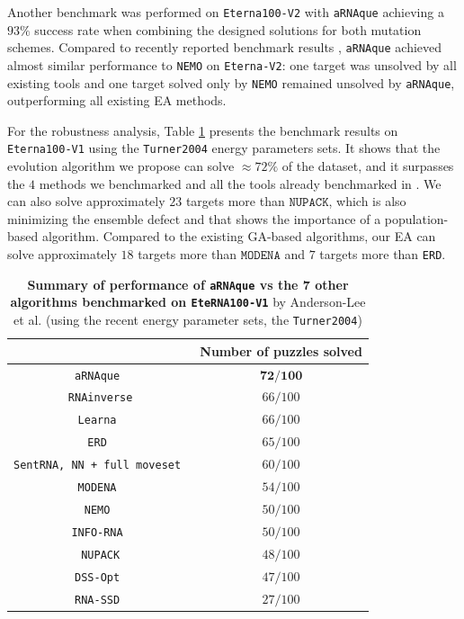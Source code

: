 Another benchmark was performed on \texttt{Eterna100-V2} with \texttt{aRNAque} achieving a $93\%$ success rate when combining the designed solutions for both mutation schemes. Compared to recently reported benchmark results \cite{Eterna}, \texttt{aRNAque} achieved almost similar performance to \texttt{NEMO} on \texttt{Eterna-V2}: one target was unsolved by all existing tools and one target solved only by \texttt{NEMO} remained unsolved by \texttt{aRNAque}, outperforming all existing EA methods. 


For the robustness analysis, Table {\ref{Tab:eterna}} presents the benchmark results on \texttt{Eterna100-V1} using the \texttt{Turner2004} energy parameters sets. It shows that the evolution algorithm we propose can solve \(\)\(\approx72\%\) of the dataset, and it surpasses the \(4\) methods we benchmarked and all the tools already benchmarked in \cite{shi2018sentrna}. We can also solve approximately \(23\) targets more than \(\texttt{NUPACK}\), which is also minimizing the ensemble defect and that shows the importance of a population-based algorithm. Compared to the existing GA-based algorithms, our EA can solve approximately \(18\) targets more than \(\texttt{MODENA}\) and $7$ targets more than \texttt{ERD}.


\begin{center}
	\begin{table}[t!]
		\caption{\textbf{Summary of performance of \texttt{aRNAque} vs the 7 other algorithms benchmarked on \texttt{EteRNA100-V1}} by Anderson-Lee et al. \cite{anderson2016principles} (using the recent energy parameter sets, the \texttt{Turner2004})} 
		\label{Tab:eterna}
		\centering
		\begin{tabular}[H]{|c|c|}
			\hline
			\text{Methods}& Number of puzzles solved\\
			\hline
			\texttt{aRNAque }&$\textbf{72/100}$\\
			\hline
			\texttt{RNAinverse}&$66/100$\\
			\hline
			\texttt{Learna }&$66/100$\\
			\hline
			\texttt{ERD }&$65/100$\\
			\hline
			\texttt{SentRNA, NN + full moveset  }&$60/100$\\
			\hline
			\texttt{MODENA }&$54/100$\\
			\hline
			\texttt{NEMO }&$50/100$\\
			\hline
			\texttt{INFO-RNA }&$50/100$\\
			\hline
			\texttt{NUPACK}&$48/100$\\
			\hline
			\texttt{DSS-Opt }&$47/100$\\
			\hline
			\texttt{RNA-SSD }&$27/100$\\
			\hline
		\end{tabular}
	\end{table}
\end{center}


